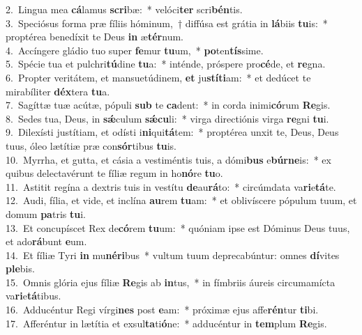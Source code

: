 {2.~}Lingua mea \textbf{cá}lamus \textbf{scri}bæ:~* velóci\textbf{ter} scri\textbf{bén}tis.\\
{3.~}Speciósus forma præ fíliis hóminum,~† diffúsa est grátia in \textbf{lá}biis \textbf{tu}is:~* proptérea benedíxit te Deus \textbf{in} æ\textbf{tér}num.\\
{4.~}Accíngere gládio tuo super \textbf{fe}mur \textbf{tu}um,~* \textbf{po}ten\textbf{tís}sime.\\
{5.~}Spécie tua et pulchri\textbf{tú}dine \textbf{tu}a:~* inténde, próspere pro\textbf{cé}de, et \textbf{re}gna.\\
{6.~}Propter veritátem, et mansuetúdinem, \textbf{et} ju\textbf{stí}\textbf{ti}am:~* et dedúcet te mirabíliter \textbf{déx}tera \textbf{tu}a.\\
{7.~}Sagíttæ tuæ acútæ, pópuli \textbf{sub} te \textbf{ca}dent:~* in corda inimi\textbf{có}rum \textbf{Re}gis.\\
{8.~}Sedes tua, Deus, in \textbf{sǽ}culum \textbf{sǽ}\textbf{cu}li:~* virga directiónis virga \textbf{re}gni \textbf{tu}i.\\
{9.~}Dilexísti justítiam, et odísti i\textbf{ni}qui\textbf{tá}tem:~* proptérea unxit te, Deus, Deus tuus, óleo lætítiæ præ con\textbf{sór}tibus \textbf{tu}is.\\
{10.~}Myrrha, et gutta, et cásia a vestiméntis tuis, a dómi\textbf{bus} e\textbf{búr}\textbf{ne}is:~* ex quibus delectavérunt te fíliæ regum in ho\textbf{nó}re \textbf{tu}o.\\
{11.~}Astitit regína a dextris tuis in vestítu \textbf{de}au\textbf{rá}to:~* circúmdata va\textbf{ri}e\textbf{tá}te.\\
{12.~}Audi, fília, et vide, et inclína \textbf{au}rem \textbf{tu}am:~* et oblivíscere pópulum tuum, et domum \textbf{pa}tris \textbf{tu}i.\\
{13.~}Et concupíscet Rex de\textbf{có}rem \textbf{tu}um:~* quóniam ipse est Dóminus Deus tuus, et ado\textbf{rá}bunt \textbf{e}um.\\
{14.~}Et fíliæ Tyri \textbf{in} mu\textbf{né}\textbf{ri}bus~* vultum tuum deprecabúntur: omnes \textbf{dí}vites \textbf{ple}bis.\\
{15.~}Omnis glória ejus fíliæ \textbf{Re}gis ab \textbf{in}tus,~* in fímbriis áureis circumamícta va\textbf{ri}e\textbf{tá}tibus.\\
{16.~}Adducéntur Regi vírgi\textbf{nes} post \textbf{e}am:~* próximæ ejus affe\textbf{rén}tur \textbf{ti}bi.\\
{17.~}Afferéntur in lætítia et exsul\textbf{ta}ti\textbf{ó}ne:~* adducéntur in \textbf{tem}plum \textbf{Re}gis.\\
